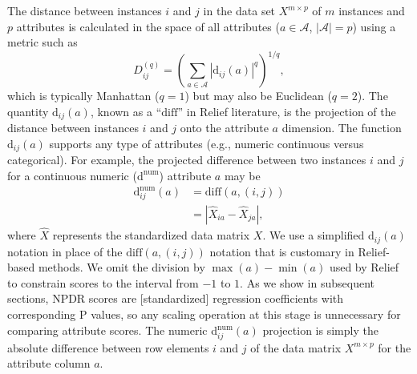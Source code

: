 \documentclass[10pt,letterpaper]{article}\usepackage[]{graphicx}\usepackage[]{color}
\def\ri{R_i}
\def\rj{R_j}
\begin{document}
The distance between instances $i$ and $j$ in the data set $X^{m \times p}$ of $m$ instances and $p$ attributes is calculated in the space of all attributes ($a \in \mathcal{A}$, $|\mathcal{A}|=p$) using a metric such as
\begin{equation}\label{eq:D}
D^{(q)}_{ij}=\left(\sum_{a\in \mathcal{A}}|\text{d}_{ij}(a)|^q\right)^{1/q},
\end{equation}
which is typically Manhattan ($q=1$) but may also be Euclidean ($q=2$). The quantity 
$\text{d}_{ij}(a)$,
known as a ``$\text{diff}$'' in Relief literature, is the projection of the distance between instances $i$ and $j$ onto the attribute $a$ dimension. The 
function $\text{d}_{ij}(a)$ supports any type of attributes
(e.g., numeric continuous versus categorical).
For example, the projected difference between two instances $i$ and $j$ for a continuous numeric ($\text{d}^{\text{num}}$) attribute $a$ may be
\begin{equation}\label{eq:diff}
\begin{aligned}
\text{d}^{\text{num}}_{ij}(a)&=\text{diff}(a,(i,j))\\
                                            & = {|\hat{X}_{ia}-\hat{X}_{ja}|},
\end{aligned}
\end{equation}
where $\hat{X}$ represents the standardized data matrix $X$.
We use a simplified d$_{ij}(a)$ notation in place of the $\text{diff}(a,(i,j))$ notation that is customary in Relief-based methods.
We omit the division by $\max(a)-\min(a)$ used by Relief to constrain scores to the interval from $-1$ to $1$.
As we show in subsequent sections, NPDR scores are [standardized] regression coefficients with corresponding P values, so any scaling operation at this stage is unnecessary for comparing attribute scores. 
The numeric d$^{\text{num}}_{ij}(a)$ projection is simply the absolute difference between row elements $i$ and $j$ of the data matrix $X^{m \times p}$ for the attribute column $a$. 
\end{document}

